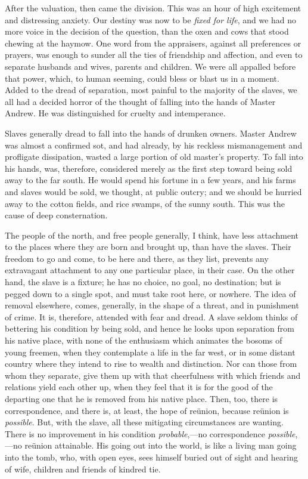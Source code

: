 After the valuation, then came the division. This was an hour of high
excitement and distressing anxiety. Our destiny was now to be
\emph{fixed for life}, and we had no more voice in the decision of the
question, than the oxen and cows that stood chewing at the haymow. One
word from the appraisers, against all preferences or prayers, was enough
to sunder all the ties of friendship and affection, and even to separate
husbands and wives, parents and children. We were all
{\protect\hypertarget{176}{}{}}appalled before that power, which, to
human seeming, could bless or blast us in a moment. Added to the dread
of separation, most painful to the majority of the slaves, we all had a
decided horror of the thought of falling into the hands of Master
Andrew. He was distinguished for cruelty and intemperance.

Slaves generally dread to fall into the hands of drunken owners. Master
Andrew was almost a confirmed sot, and had already, by his reckless
mismanagement and profligate dissipation, wasted a large portion of old
master's property. To fall into his hands, was, therefore, considered
merely as the first step toward being sold away to the far south. He
would spend his fortune in a few years, and his farms and slaves would
be sold, we thought, at public outcry; and we should be hurried away to
the cotton fields, and rice swamps, of the sunny south. This was the
cause of deep consternation.

The people of the north, and free people generally, I think, have less
attachment to the places where they are born and brought up, than have
the slaves. Their freedom to go and come, to be here and there, as they
list, prevents any extravagant attachment to any one particular place,
in their case. On the other hand, the slave is a fixture; he has no
choice, no goal, no destination; but is pegged down to a single spot,
and must take root here, or nowhere. The idea of removal elsewhere,
comes, generally, in the shape of a threat, and in punishment of crime.
It is, therefore, attended with fear and dread. A slave seldom thinks of
bettering his condition by being sold, and hence he looks upon
separation from his native place, with
{\protect\hypertarget{177}{}{}}none of the enthusiasm which animates the
bosoms of young freemen, when they contemplate a life in the far west,
or in some distant country where they intend to rise to wealth and
distinction. Nor can those from whom they separate, give them up with
that cheerfulness with which friends and relations yield each other up,
when they feel that it is for the good of the departing one that he is
removed from his native place. Then, too, there is correspondence, and
there is, at least, the hope of reünion, because reünion is
\emph{possible}. But, with the slave, all these mitigating circumstances
are wanting. There is no improvement in his condition
\emph{probable},---no correspondence \emph{possible},---no reünion
attainable. His going out into the world, is like a living man going
into the tomb, who, with open eyes, sees himself buried out of sight and
hearing of wife, children and friends of kindred tie.


